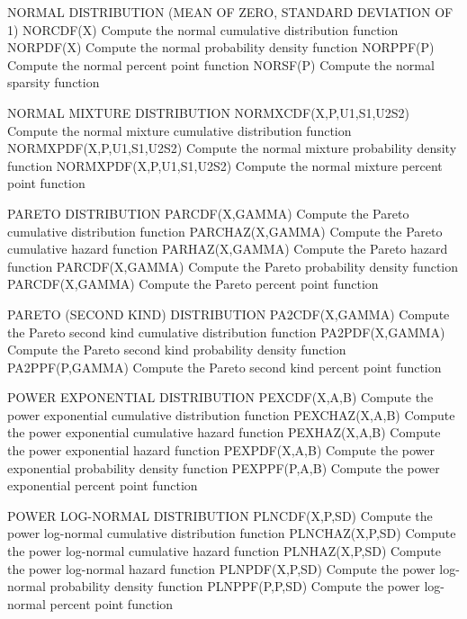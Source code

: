 NORMAL DISTRIBUTION (MEAN OF ZERO, STANDARD DEVIATION OF 1)
   NORCDF(X)          Compute the normal cumulative distribution
                      function
   NORPDF(X)          Compute the normal probability density function
   NORPPF(P)          Compute the normal percent point function
   NORSF(P)           Compute the normal sparsity function
 
NORMAL MIXTURE DISTRIBUTION
   NORMXCDF(X,P,U1,S1,U2S2)  Compute the normal mixture cumulative
                             distribution function
   NORMXPDF(X,P,U1,S1,U2S2)  Compute the normal mixture probability
                             density function
   NORMXPDF(X,P,U1,S1,U2S2)  Compute the normal mixture percent point
                             function
 
PARETO DISTRIBUTION
   PARCDF(X,GAMMA)    Compute the Pareto cumulative distribution
                      function
   PARCHAZ(X,GAMMA)   Compute the Pareto cumulative hazard
                      function
   PARHAZ(X,GAMMA)    Compute the Pareto hazard function
   PARCDF(X,GAMMA)    Compute the Pareto probability density function
   PARCDF(X,GAMMA)    Compute the Pareto percent point function
 
PARETO (SECOND KIND) DISTRIBUTION
   PA2CDF(X,GAMMA)    Compute the Pareto second kind cumulative
                      distribution function
   PA2PDF(X,GAMMA)    Compute the Pareto second kind probability
                      density function
   PA2PPF(P,GAMMA)    Compute the Pareto second kind percent point
                      function
 
POWER EXPONENTIAL DISTRIBUTION
   PEXCDF(X,A,B)      Compute the power exponential cumulative
                      distribution function
   PEXCHAZ(X,A,B)     Compute the power exponential cumulative
                      hazard function
   PEXHAZ(X,A,B)      Compute the power exponential hazard function
   PEXPDF(X,A,B)      Compute the power exponential probability
                      density function
   PEXPPF(P,A,B)      Compute the power exponential percent point
                      function
 
POWER LOG-NORMAL DISTRIBUTION
   PLNCDF(X,P,SD)     Compute the power log-normal cumulative
                      distribution function
   PLNCHAZ(X,P,SD)    Compute the power log-normal cumulative
                      hazard function
   PLNHAZ(X,P,SD)     Compute the power log-normal hazard function
   PLNPDF(X,P,SD)     Compute the power log-normal probability density
                      function
   PLNPPF(P,P,SD)     Compute the power log-normal percent point
                      function
 
